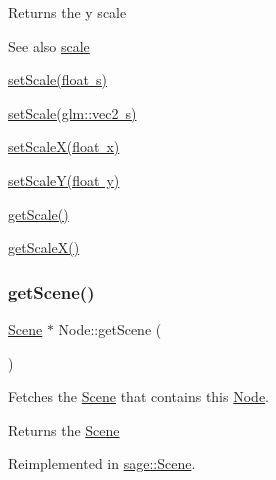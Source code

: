 \begin{DoxyReturn}{Returns}
the y scale 
\end{DoxyReturn}
\begin{DoxySeeAlso}{See also}
\mbox{\hyperlink{classsage_1_1Node_a3014b585d97d3a449e83bc0252db0c50}{scale}} 

\mbox{\hyperlink{classsage_1_1Node_a939698b2eb68ee5b60b91e2426e95369}{set\+Scale(float s)}} 

\mbox{\hyperlink{classsage_1_1Node_aecff30b003ce1c2266cc60a34b72559d}{set\+Scale(glm\+::vec2 s)}} 

\mbox{\hyperlink{classsage_1_1Node_ab8126397f90ccdee0755b984b26809d8}{set\+Scale\+X(float x)}} 

\mbox{\hyperlink{classsage_1_1Node_afa22161545d63e9e011f8eeb5acdead7}{set\+Scale\+Y(float y)}} 

\mbox{\hyperlink{classsage_1_1Node_af1a9bc0715acbc80623b5a15a5f65f3f}{get\+Scale()}} 

\mbox{\hyperlink{classsage_1_1Node_a27040ef8ab59ccf42b87d6ddc8d794e6}{get\+Scale\+X()}} 
\end{DoxySeeAlso}
\mbox{\label{classsage_1_1Node_a22d0dfa466965da0324d47d22eb24e6b}} 
\subsubsection{\texorpdfstring{getScene()}{getScene()}}
{\footnotesize\ttfamily \mbox{\hyperlink{classsage_1_1Scene}{Scene}} $\ast$ Node\+::get\+Scene (\begin{DoxyParamCaption}{ }\end{DoxyParamCaption})\hspace{0.3cm}{\ttfamily [virtual]}}



Fetches the \mbox{\hyperlink{classsage_1_1Scene}{Scene}} that contains this \mbox{\hyperlink{classsage_1_1Node}{Node}}. 

\begin{DoxyReturn}{Returns}
the \mbox{\hyperlink{classsage_1_1Scene}{Scene}} 
\end{DoxyReturn}


Reimplemented in \mbox{\hyperlink{classsage_1_1Scene_ab09415b375ad054825e9fd4d4e471c6b}{sage\+::\+Scene}}.

\mbox{\label{classsage_1_1Node_a286d3b5b0d16d31991b58cab972fb03b}} 
